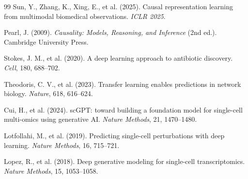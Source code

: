 \documentclass[11pt]{article}
\begin{document}
\begin{thebibliography}{99}
Sun, Y., Zhang, K., Xing, E., et al. (2025). Causal representation learning from multimodal biomedical observations. \textit{ICLR 2025}.

Pearl, J. (2009). \textit{Causality: Models, Reasoning, and Inference} (2nd ed.). Cambridge University Press.

Stokes, J. M., et al. (2020). A deep learning approach to antibiotic discovery. \textit{Cell}, 180, 688--702.

Theodoris, C. V., et al. (2023). Transfer learning enables predictions in network biology. \textit{Nature}, 618, 616--624.

Cui, H., et al. (2024). scGPT: toward building a foundation model for single-cell multi-omics using generative AI. \textit{Nature Methods}, 21, 1470--1480.

Lotfollahi, M., et al. (2019). Predicting single-cell perturbations with deep learning. \textit{Nature Methods}, 16, 715--721.

Lopez, R., et al. (2018). Deep generative modeling for single-cell transcriptomics. \textit{Nature Methods}, 15, 1053--1058.

\end{thebibliography}
\end{document}
